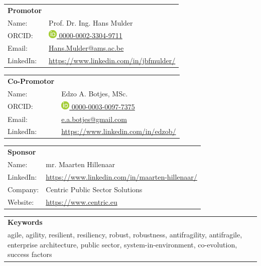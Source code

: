 	\begin{tabular}{p{}p{}}
		\textbf{Promotor} & \\
		Name: & Prof. Dr. Ing. Hans Mulder \\
		ORCID: & \href{https://orcid.org/0000-0002-3304-9711/}{\includegraphics[scale=0.45]{images/ORCIDiD_icon} 0000-0002-3304-9711}\\
		Email: & \href{mailto:hans.mulder@ams.ac.be}{Hans.Mulder@ams.ac.be}\\
		LinkedIn: & \url{https://www.linkedin.com/in/jbfmulder/}\\
	\end{tabular}

\vspace{\baselineskip}

	\begin{tabular}{p{}p{}}
		\textbf{Co-Promotor} & \\
		Name: & Edzo A. Botjes, MSc. \\
		ORCID: & \href{https://orcid.org/0000-0003-0097-7375/}{\includegraphics[scale=0.45]{images/ORCIDiD_icon} 0000-0003-0097-7375}\\
		Email: & \href{mailto:e.a.botjes@gmail.com}{e.a.botjes@gmail.com}\\
		LinkedIn: & \url{https://www.linkedin.com/in/edzob/}\\
	\end{tabular}

\vspace{\baselineskip}

	\begin{tabular}{p{}p{}}
		\textbf{Sponsor} & \\
		Name: & mr. Maarten Hillenaar \\
		LinkedIn:	&	\url{https://www.linkedin.com/in/maarten-hillenaar/}\\
		Company:	&	Centric Public Sector Solutions\\
		Website:	&	\url{https://www.centric.eu}
	\end{tabular}

\vspace{\baselineskip}

	\begin{tabular}{p{}}
		\textbf{Keywords} \\
		agile, agility, resilient, resiliency, robust, robustness, antifragility, antifragile, enterprise architecture, public sector, system-in-environment, co-evolution, success factors\\%
	\end{tabular}
